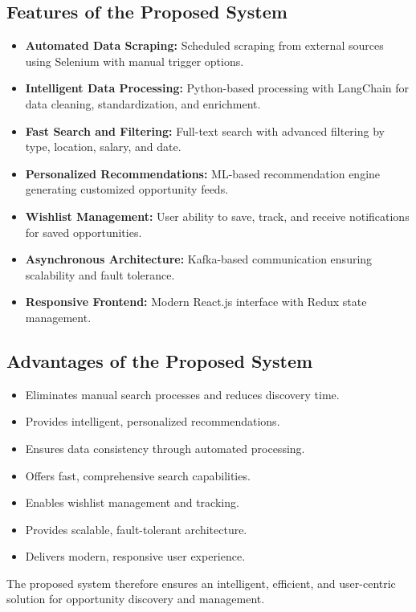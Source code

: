 \documentclass[12pt,a4paper]{report}
\begin{document}
\subsection*{Features of the Proposed System}
\begin{itemize}
    \item \textbf{Automated Data Scraping:} Scheduled scraping from external sources using Selenium with manual trigger options.
    \item \textbf{Intelligent Data Processing:} Python-based processing with LangChain for data cleaning, standardization, and enrichment.
    \item \textbf{Fast Search and Filtering:} Full-text search with advanced filtering by type, location, salary, and date.
    \item \textbf{Personalized Recommendations:} ML-based recommendation engine generating customized opportunity feeds.
    \item \textbf{Wishlist Management:} User ability to save, track, and receive notifications for saved opportunities.
    \item \textbf{Asynchronous Architecture:} Kafka-based communication ensuring scalability and fault tolerance.
    \item \textbf{Responsive Frontend:} Modern React.js interface with Redux state management.
\end{itemize}

\subsection*{Advantages of the Proposed System}
\begin{itemize}
    \item Eliminates manual search processes and reduces discovery time.
    \item Provides intelligent, personalized recommendations.
    \item Ensures data consistency through automated processing.
    \item Offers fast, comprehensive search capabilities.
    \item Enables wishlist management and tracking.
    \item Provides scalable, fault-tolerant architecture.
    \item Delivers modern, responsive user experience.
\end{itemize}

The proposed system therefore ensures an intelligent, efficient, and
user-centric solution for opportunity discovery and management.
\end{document}
